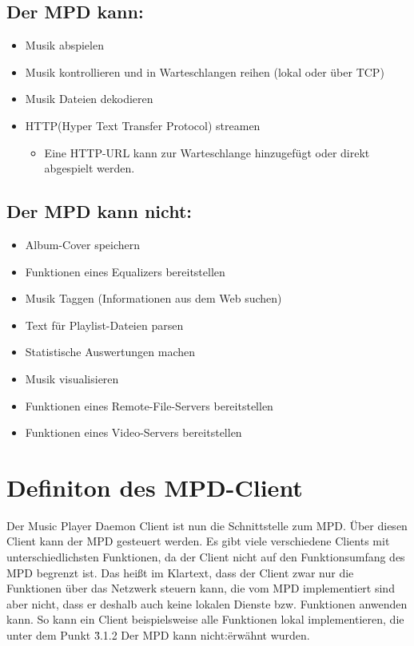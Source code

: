 \subsection{Der MPD kann:}
\renewcommand{\labelitemi}{•}
\begin{itemize}
        \item Musik abspielen
        \item Musik kontrollieren und in Warteschlangen reihen (lokal oder über TCP)
        \item Musik Dateien dekodieren
        \item HTTP(Hyper Text Transfer Protocol) streamen
        \renewcommand{\labelitemi}{--}
        \begin{itemize}
                \item Eine HTTP-URL kann zur Warteschlange hinzugefügt oder direkt abgespielt werden.\\
        \end{itemize}
\end{itemize}

\subsection{Der MPD kann nicht:}

\renewcommand{\labelitemi}{•}
\begin{itemize}
        \item Album-Cover speichern
        \item Funktionen eines Equalizers bereitstellen
        \item Musik Taggen (Informationen aus dem Web suchen)
        \item Text für Playlist-Dateien parsen
        \item Statistische Auswertungen machen
        \item Musik visualisieren
        \item Funktionen eines Remote-File-Servers bereitstellen
        \item Funktionen eines Video-Servers bereitstellen
\end{itemize}
\section{Definiton des MPD-Client}
Der Music Player Daemon Client ist nun die Schnittstelle zum MPD. Über diesen Client kann der MPD
gesteuert werden. Es gibt viele verschiedene Clients mit unterschiedlichsten Funktionen, da der 
Client nicht auf den Funktionsumfang des MPD begrenzt ist. Das heißt im Klartext, dass der Client
zwar nur die Funktionen über das Netzwerk steuern kann, die vom MPD implementiert sind aber nicht, 
dass er deshalb auch keine lokalen Dienste bzw. Funktionen anwenden kann. So kann ein Client 
beispielsweise alle Funktionen lokal implementieren, die unter dem Punkt \"3.1.2 Der MPD kann nicht:\" 
erwähnt wurden.
\newpage
